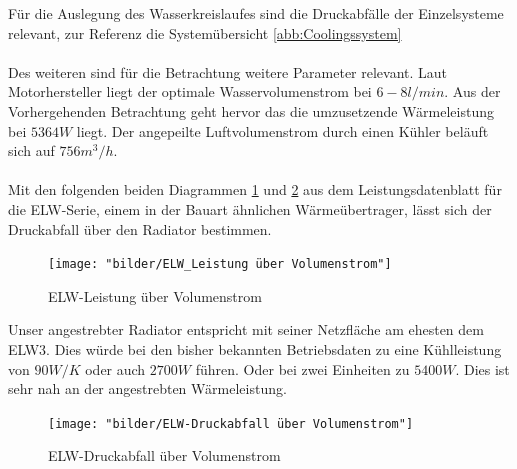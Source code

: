 Für die Auslegung des Wasserkreislaufes sind die Druckabfälle der Einzelsysteme relevant, zur Referenz die Systemübersicht \ref{abb:Coolingssystem}\\
\\
Des weiteren sind für die Betrachtung weitere Parameter relevant. Laut Motorhersteller \cite{ManualEmrax208} liegt der optimale Wasservolumenstrom bei  \ensuremath{6-8l/min}. Aus der Vorhergehenden Betrachtung geht hervor das die umzusetzende Wärmeleistung bei \ensuremath{5364 W} liegt. Der angepeilte Luftvolumenstrom durch einen Kühler beläuft sich auf \ensuremath{756 m^3/h}.\\
\\
Mit den folgenden beiden Diagrammen \ref{fig:elwleistung-uber-volumenstrom} und \ref{fig:elw-druckabfall-uber-volumenstrom} aus dem Leistungsdatenblatt für die ELW-Serie, einem in der Bauart ähnlichen Wärmeübertrager, lässt sich der Druckabfall über den Radiator bestimmen.

\begin{figure}[h]
	\centering
	\texttt{[image: "bilder/ELW\_Leistung über Volumenstrom"]}
	\caption{ELW-Leistung über Volumenstrom \cite{DatenblattELW}}
	\label{fig:elwleistung-uber-volumenstrom}
\end{figure}

Unser angestrebter Radiator entspricht mit seiner Netzfläche am ehesten dem ELW3. Dies würde bei den bisher bekannten Betriebsdaten zu eine Kühlleistung von \ensuremath{90 W/K} oder auch \ensuremath{2700 W} führen. Oder bei zwei Einheiten zu \ensuremath{5400 W}. Dies ist sehr nah an der angestrebten Wärmeleistung.

\begin{figure}[h]
	\centering
	\texttt{[image: "bilder/ELW-Druckabfall über Volumenstrom"]}
	\caption{ELW-Druckabfall über Volumenstrom \cite{DatenblattELW}}
	\label{fig:elw-druckabfall-uber-volumenstrom}
\end{figure}


